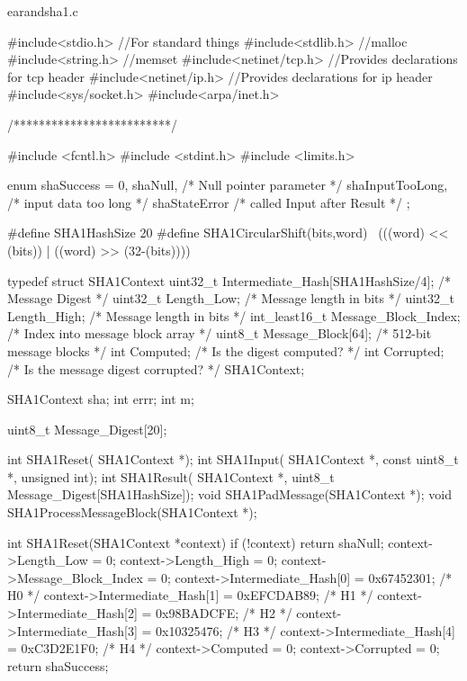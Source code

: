 \begin{chunk}{earandsha1.c}

#include<stdio.h> //For standard things
#include<stdlib.h>    //malloc
#include<string.h>    //memset
#include<netinet/tcp.h>   //Provides declarations for tcp header
#include<netinet/ip.h>    //Provides declarations for ip header
#include<sys/socket.h>
#include<arpa/inet.h>


/*************************/



#include <fcntl.h>
#include <stdint.h>
#include <limits.h> 

enum
{
    shaSuccess = 0,
    shaNull,            /* Null pointer parameter */
    shaInputTooLong,    /* input data too long */
    shaStateError       /* called Input after Result */
};

#define SHA1HashSize 20
#define SHA1CircularShift(bits,word) \
                (((word) << (bits)) | ((word) >> (32-(bits))))


typedef struct SHA1Context
{
 uint32_t Intermediate_Hash[SHA1HashSize/4]; /* Message Digest          */
 uint32_t Length_Low;               /* Message length in bits           */
 uint32_t Length_High;              /* Message length in bits           */
 int_least16_t Message_Block_Index; /* Index into message block array   */
 uint8_t Message_Block[64];         /* 512-bit message blocks           */
 int Computed;                      /* Is the digest computed?          */
 int Corrupted;                     /* Is the message digest corrupted? */
} SHA1Context;

SHA1Context sha;
  int errr;
int m;
 
 uint8_t Message_Digest[20];



int SHA1Reset(  SHA1Context *);
int SHA1Input(  SHA1Context *, const uint8_t *, unsigned int);
int SHA1Result( SHA1Context *, uint8_t Message_Digest[SHA1HashSize]);
void SHA1PadMessage(SHA1Context *);
void SHA1ProcessMessageBlock(SHA1Context *);

int SHA1Reset(SHA1Context *context) {
  if (!context) {
    return shaNull;
  }
  context->Length_Low             = 0;
  context->Length_High            = 0;
  context->Message_Block_Index    = 0;
  context->Intermediate_Hash[0]   = 0x67452301;  /* H0 */
  context->Intermediate_Hash[1]   = 0xEFCDAB89;  /* H1 */
  context->Intermediate_Hash[2]   = 0x98BADCFE;  /* H2 */
  context->Intermediate_Hash[3]   = 0x10325476;  /* H3 */
  context->Intermediate_Hash[4]   = 0xC3D2E1F0;  /* H4 */
  context->Computed   = 0;
  context->Corrupted  = 0;
  return shaSuccess;
}


\end{chunk}

